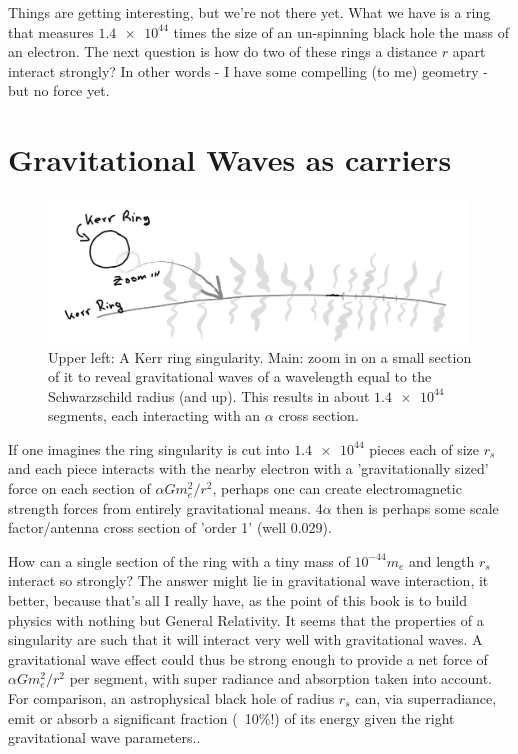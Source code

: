 \documentclass[../rzero]{subfiles}
\begin{document}
Things are getting interesting, but we're not there yet. What we have is a ring that measures $\num{1.4e44}$ times the size of an un-spinning black hole the mass of an electron. The next question is how do two of these rings a distance $r$ apart interact strongly? In other words - I have some compelling (to me) geometry - but no force yet. 


\section{Gravitational Waves as carriers}

\begin{figure}\label{kerr-electric-image}
\includegraphics[width=0.99\textwidth]{chapters/images/kerr-electric.png}
\caption{Upper left: A Kerr ring singularity. Main: zoom in on a small section of it to reveal gravitational waves of a wavelength equal to the Schwarzschild radius (and up). This results in about $\num{1.4e44}$ segments, each interacting with an $\alpha$ cross section.}
\end{figure}



 If one imagines the ring singularity is cut into $\num{1.4e44} $ pieces each of size $r_s$ and each piece interacts with the nearby electron with a 'gravitationally sized' force on each section of $\alpha G m_e^2/r^2 $, perhaps one can create electromagnetic strength forces from entirely gravitational means. $4\alpha$ then is perhaps some scale factor/antenna cross section of 'order 1' (well $ 0.029$).
   
 How can a single section of the ring with a tiny mass of $ 10^{-44}m_e $ and length $r_s$ interact so strongly? The answer might lie in gravitational wave interaction, it better, because that's all I really have, as the point of this book is to build physics with nothing but General Relativity.  It seems that the properties of a singularity are such that it will interact very well\cite{Nakamura1993} with gravitational waves. A gravitational wave effect could thus be strong enough to provide a net force of $\alpha G m_e^2/r^2 $ per segment, with super radiance and absorption taken into account. For comparison, an astrophysical black hole of radius $r_s$ can, via superradiance, emit or absorb a significant fraction (~10\%!) of its energy given the right gravitational wave parameters.\cite{Brito2015}.  
  
\end{document}
